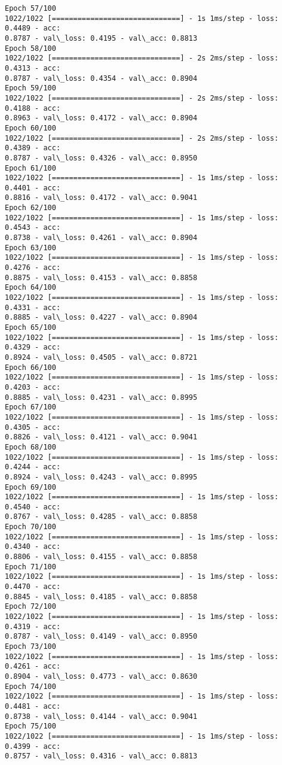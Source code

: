 \documentclass[11pt]{article}
\begin{document}
\begin{Verbatim}[commandchars=\\\{\}]
Epoch 57/100
1022/1022 [==============================] - 1s 1ms/step - loss: 0.4489 - acc:
0.8787 - val\_loss: 0.4195 - val\_acc: 0.8813
Epoch 58/100
1022/1022 [==============================] - 2s 2ms/step - loss: 0.4313 - acc:
0.8787 - val\_loss: 0.4354 - val\_acc: 0.8904
Epoch 59/100
1022/1022 [==============================] - 2s 2ms/step - loss: 0.4188 - acc:
0.8963 - val\_loss: 0.4172 - val\_acc: 0.8904
Epoch 60/100
1022/1022 [==============================] - 2s 2ms/step - loss: 0.4389 - acc:
0.8787 - val\_loss: 0.4326 - val\_acc: 0.8950
Epoch 61/100
1022/1022 [==============================] - 1s 1ms/step - loss: 0.4401 - acc:
0.8816 - val\_loss: 0.4172 - val\_acc: 0.9041
Epoch 62/100
1022/1022 [==============================] - 1s 1ms/step - loss: 0.4543 - acc:
0.8738 - val\_loss: 0.4261 - val\_acc: 0.8904
Epoch 63/100
1022/1022 [==============================] - 1s 1ms/step - loss: 0.4276 - acc:
0.8875 - val\_loss: 0.4153 - val\_acc: 0.8858
Epoch 64/100
1022/1022 [==============================] - 1s 1ms/step - loss: 0.4331 - acc:
0.8885 - val\_loss: 0.4227 - val\_acc: 0.8904
Epoch 65/100
1022/1022 [==============================] - 1s 1ms/step - loss: 0.4329 - acc:
0.8924 - val\_loss: 0.4505 - val\_acc: 0.8721
Epoch 66/100
1022/1022 [==============================] - 1s 1ms/step - loss: 0.4203 - acc:
0.8885 - val\_loss: 0.4231 - val\_acc: 0.8995
Epoch 67/100
1022/1022 [==============================] - 1s 1ms/step - loss: 0.4305 - acc:
0.8826 - val\_loss: 0.4121 - val\_acc: 0.9041
Epoch 68/100
1022/1022 [==============================] - 1s 1ms/step - loss: 0.4244 - acc:
0.8924 - val\_loss: 0.4243 - val\_acc: 0.8995
Epoch 69/100
1022/1022 [==============================] - 1s 1ms/step - loss: 0.4540 - acc:
0.8767 - val\_loss: 0.4285 - val\_acc: 0.8858
Epoch 70/100
1022/1022 [==============================] - 1s 1ms/step - loss: 0.4340 - acc:
0.8806 - val\_loss: 0.4155 - val\_acc: 0.8858
Epoch 71/100
1022/1022 [==============================] - 1s 1ms/step - loss: 0.4470 - acc:
0.8845 - val\_loss: 0.4185 - val\_acc: 0.8858
Epoch 72/100
1022/1022 [==============================] - 1s 1ms/step - loss: 0.4319 - acc:
0.8787 - val\_loss: 0.4149 - val\_acc: 0.8950
Epoch 73/100
1022/1022 [==============================] - 1s 1ms/step - loss: 0.4261 - acc:
0.8904 - val\_loss: 0.4773 - val\_acc: 0.8630
Epoch 74/100
1022/1022 [==============================] - 1s 1ms/step - loss: 0.4481 - acc:
0.8738 - val\_loss: 0.4144 - val\_acc: 0.9041
Epoch 75/100
1022/1022 [==============================] - 1s 1ms/step - loss: 0.4399 - acc:
0.8757 - val\_loss: 0.4316 - val\_acc: 0.8813

\end{Verbatim}
\end{document}
